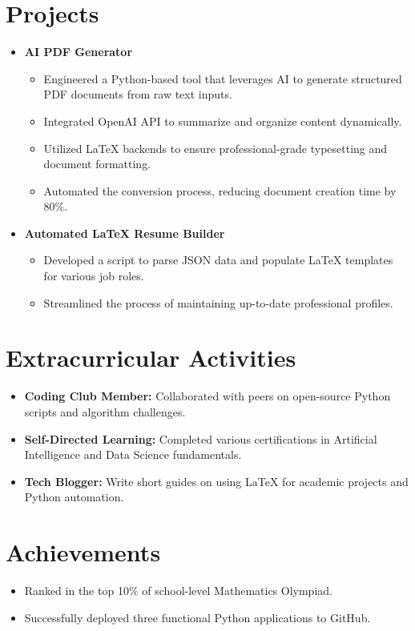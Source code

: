 \documentclass[11pt, a4paper]{article}
\begin{document}
\section*{Projects}
\begin{itemize}
    \item \textbf{AI PDF Generator}
    \begin{itemize}
        \item Engineered a Python-based tool that leverages AI to generate structured PDF documents from raw text inputs.
        \item Integrated OpenAI API to summarize and organize content dynamically.
        \item Utilized LaTeX backends to ensure professional-grade typesetting and document formatting.
        \item Automated the conversion process, reducing document creation time by 80\%.
    \end{itemize}
    \item \textbf{Automated LaTeX Resume Builder}
    \begin{itemize}
        \item Developed a script to parse JSON data and populate LaTeX templates for various job roles.
        \item Streamlined the process of maintaining up-to-date professional profiles.
    \end{itemize}
\end{itemize}

\section*{Extracurricular Activities}
\begin{itemize}
    \item \textbf{Coding Club Member:} Collaborated with peers on open-source Python scripts and algorithm challenges.
    \item \textbf{Self-Directed Learning:} Completed various certifications in Artificial Intelligence and Data Science fundamentals.
    \item \textbf{Tech Blogger:} Write short guides on using LaTeX for academic projects and Python automation.
\end{itemize}

\section*{Achievements}
\begin{itemize}
    \item Ranked in the top 10\% of school-level Mathematics Olympiad.
    \item Successfully deployed three functional Python applications to GitHub.
\end{itemize}
\end{document}
